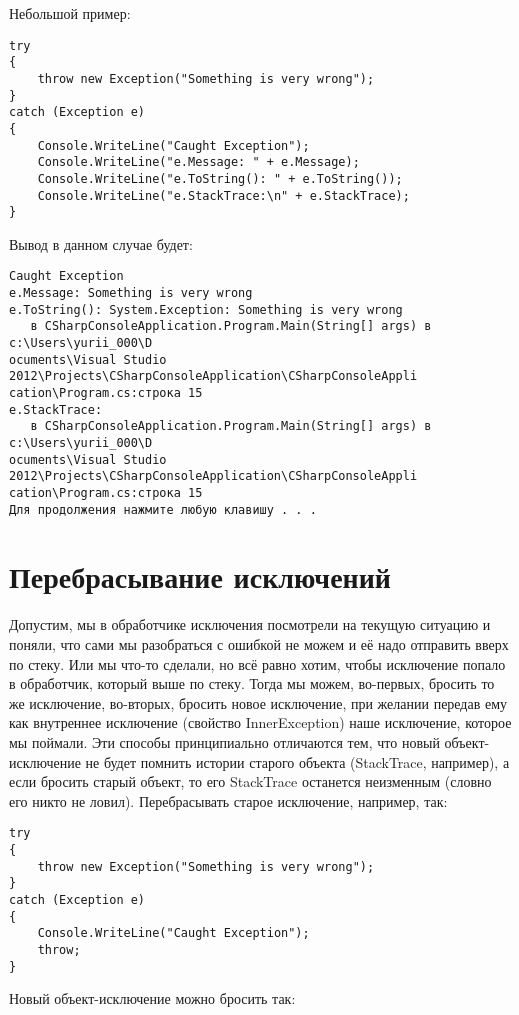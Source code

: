 \documentclass[a5paper]{article}
\begin{document}
Небольшой пример:

\begin{verbatim}
try
{
    throw new Exception("Something is very wrong");
}
catch (Exception e)
{
    Console.WriteLine("Caught Exception");
    Console.WriteLine("e.Message: " + e.Message);
    Console.WriteLine("e.ToString(): " + e.ToString());
    Console.WriteLine("e.StackTrace:\n" + e.StackTrace);
}
\end{verbatim}

Вывод в данном случае будет:

\begin{verbatim}
Caught Exception
e.Message: Something is very wrong
e.ToString(): System.Exception: Something is very wrong
   в CSharpConsoleApplication.Program.Main(String[] args) в c:\Users\yurii_000\D
ocuments\Visual Studio 2012\Projects\CSharpConsoleApplication\CSharpConsoleAppli
cation\Program.cs:строка 15
e.StackTrace:
   в CSharpConsoleApplication.Program.Main(String[] args) в c:\Users\yurii_000\D
ocuments\Visual Studio 2012\Projects\CSharpConsoleApplication\CSharpConsoleAppli
cation\Program.cs:строка 15
Для продолжения нажмите любую клавишу . . .
\end{verbatim}

\section{Перебрасывание исключений}

Допустим, мы в обработчике исключения посмотрели на текущую ситуацию и поняли, что сами мы разобраться с ошибкой не можем и её надо отправить вверх по стеку. Или мы что-то сделали, но всё равно хотим, чтобы исключение попало в обработчик, который выше по стеку. Тогда мы можем, во-первых, бросить то же исключение, во-вторых, бросить новое исключение, при желании передав ему как внутреннее исключение (свойство InnerException) наше исключение, которое мы поймали. Эти способы принципиально отличаются тем, что новый объект-исключение не будет помнить истории старого объекта (StackTrace, например), а если бросить старый объект, то его StackTrace останется неизменным (словно его никто не ловил). Перебрасывать старое исключение, например, так:

\begin{verbatim}
try
{
    throw new Exception("Something is very wrong");
}
catch (Exception e)
{
    Console.WriteLine("Caught Exception");
    throw;
}
\end{verbatim}

Новый объект-исключение можно бросить так:
\end{document}
